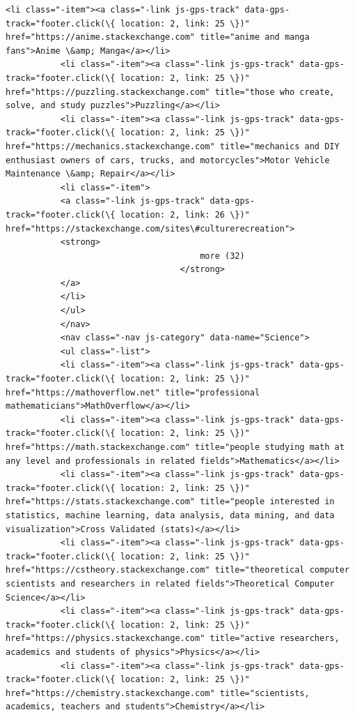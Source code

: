 \documentclass[11pt]{article}
\begin{document}
\begin{Verbatim}[commandchars=\\\{\}]
           <li class="-item"><a class="-link js-gps-track" data-gps-track="footer.click(\{ location: 2, link: 25 \})" href="https://anime.stackexchange.com" title="anime and manga fans">Anime \&amp; Manga</a></li>
           <li class="-item"><a class="-link js-gps-track" data-gps-track="footer.click(\{ location: 2, link: 25 \})" href="https://puzzling.stackexchange.com" title="those who create, solve, and study puzzles">Puzzling</a></li>
           <li class="-item"><a class="-link js-gps-track" data-gps-track="footer.click(\{ location: 2, link: 25 \})" href="https://mechanics.stackexchange.com" title="mechanics and DIY enthusiast owners of cars, trucks, and motorcycles">Motor Vehicle Maintenance \&amp; Repair</a></li>
           <li class="-item">
           <a class="-link js-gps-track" data-gps-track="footer.click(\{ location: 2, link: 26 \})" href="https://stackexchange.com/sites\#culturerecreation">
           <strong>
                                       more (32)
                                   </strong>
           </a>
           </li>
           </ul>
           </nav>
           <nav class="-nav js-category" data-name="Science">
           <ul class="-list">
           <li class="-item"><a class="-link js-gps-track" data-gps-track="footer.click(\{ location: 2, link: 25 \})" href="https://mathoverflow.net" title="professional mathematicians">MathOverflow</a></li>
           <li class="-item"><a class="-link js-gps-track" data-gps-track="footer.click(\{ location: 2, link: 25 \})" href="https://math.stackexchange.com" title="people studying math at any level and professionals in related fields">Mathematics</a></li>
           <li class="-item"><a class="-link js-gps-track" data-gps-track="footer.click(\{ location: 2, link: 25 \})" href="https://stats.stackexchange.com" title="people interested in statistics, machine learning, data analysis, data mining, and data visualization">Cross Validated (stats)</a></li>
           <li class="-item"><a class="-link js-gps-track" data-gps-track="footer.click(\{ location: 2, link: 25 \})" href="https://cstheory.stackexchange.com" title="theoretical computer scientists and researchers in related fields">Theoretical Computer Science</a></li>
           <li class="-item"><a class="-link js-gps-track" data-gps-track="footer.click(\{ location: 2, link: 25 \})" href="https://physics.stackexchange.com" title="active researchers, academics and students of physics">Physics</a></li>
           <li class="-item"><a class="-link js-gps-track" data-gps-track="footer.click(\{ location: 2, link: 25 \})" href="https://chemistry.stackexchange.com" title="scientists, academics, teachers and students">Chemistry</a></li>

\end{Verbatim}
\end{document}
